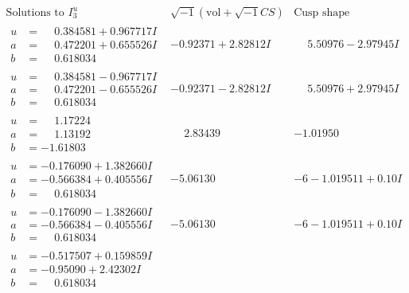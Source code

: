 \documentclass[1p]{elsarticle_modified}
\theoremstyle{definition}
\newcommand{\I}{\sqrt{-1}}
\begin{document}
$$\begin{array}{c|c|c}  
\text{Solutions to }I^u_{3}& \I (\text{vol} + \sqrt{-1}CS) & \text{Cusp shape}\\
 \hline 
\begin{aligned}
u &= \phantom{-}0.384581 + 0.967717 I \\
a &= \phantom{-}0.472201 + 0.655526 I \\
b &= \phantom{-}0.618034\phantom{ +0.000000I}\end{aligned}
 & -0.92371 + 2.82812 I & \phantom{-}5.50976 - 2.97945 I \\ \hline\begin{aligned}
u &= \phantom{-}0.384581 - 0.967717 I \\
a &= \phantom{-}0.472201 - 0.655526 I \\
b &= \phantom{-}0.618034\phantom{ +0.000000I}\end{aligned}
 & -0.92371 - 2.82812 I & \phantom{-}5.50976 + 2.97945 I \\ \hline\begin{aligned}
u &= \phantom{-}1.17224\phantom{ +0.000000I} \\
a &= \phantom{-}1.13192\phantom{ +0.000000I} \\
b &= -1.61803\phantom{ +0.000000I}\end{aligned}
 & \phantom{-}2.83439\phantom{ +0.000000I} & -1.01950\phantom{ +0.000000I} \\ \hline\begin{aligned}
u &= -0.176090 + 1.382660 I \\
a &= -0.566384 + 0.405556 I \\
b &= \phantom{-}0.618034\phantom{ +0.000000I}\end{aligned}
 & -5.06130\phantom{ +0.000000I} &                  -6
-1.019511 + 0. 10   I\phantom{ +0.000000I} \\ \hline\begin{aligned}
u &= -0.176090 - 1.382660 I \\
a &= -0.566384 - 0.405556 I \\
b &= \phantom{-}0.618034\phantom{ +0.000000I}\end{aligned}
 & -5.06130\phantom{ +0.000000I} &                  -6
-1.019511 + 0. 10   I\phantom{ +0.000000I} \\ \hline\begin{aligned}
u &= -0.517507 + 0.159859 I \\
a &= -0.95090 + 2.42302 I \\
b &= \phantom{-}0.618034\phantom{ +0.000000I}\end{aligned}

\end{array}$$
\end{document}
